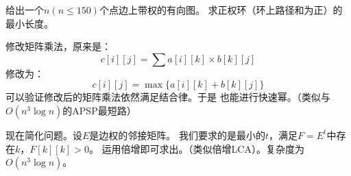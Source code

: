 \begin{prob}
	给出一个$n(n \le 150)$个点边上带权的有向图。
	求正权环（环上路径和为正）的最小长度。
\end{prob}

\begin{sol}
	修改矩阵乘法，原来是：
	\begin{displaymath}
		c[i][j] = \sum a[i][k] \times b[k][j]
	\end{displaymath}
	修改为：
	\begin{displaymath}
		c[i][j] = \max \{a[i][k] + b[k][j]\}
	\end{displaymath}
	可以验证修改后的矩阵乘法依然满足结合律。于是
	也能进行快速幂。（类似与$O(n^3 \log n)$的APSP最短路）\par
	现在简化问题。设$E$是边权的邻接矩阵。
	我们要求的是最小的$t$，满足$F=E^t$中存在$k$，$F[k][k] > 0$。
	运用倍增即可求出。（类似倍增LCA）。复杂度为$O(n^3 \log n)$。
\end{sol}

